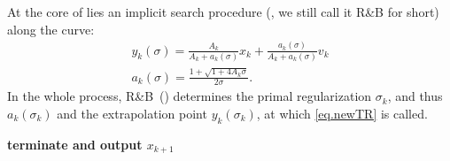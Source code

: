\documentclass{article}
\begin{document}
At the core of  lies an implicit search procedure (, we still call it R\&B for short) along the curve:
\begin{gather} \label{eq.update yk} y_k(\sigma) = \frac{A_k}{A_k+a_k(\sigma)}x_k+\frac{a_k(\sigma)}{A_k+a_k(\sigma)}v_k\\ \label{eq.update ak} a_k(\sigma) =\frac{1+\sqrt{1+4A_k\sigma}}{2\sigma}.
\end{gather}
In the whole process, R\&B~() determines the primal regularization $\sigma_k$, and thus $a_k(\sigma_k)$ and the extrapolation point $y_k(\sigma_k)$, at which \ref{eq.newTR} is called.
\begin{algorithm}[ht]
    \caption{Accelerated Trust-Region Extragradient Method~(\atrms{})}\label{alg.ms accelerated utr}
    \begin{algorithmic}[1]
        \STATE \textbf{terminate and output $x_{k+1}$
            \label{line.early terminate ms}
        }
        \ENDIF
        \ENDFOR
    \end{algorithmic}
\end{algorithm}
\end{document}
